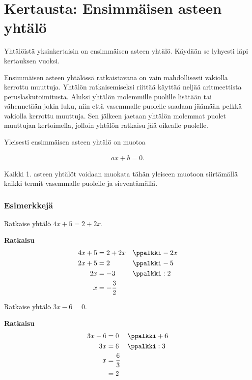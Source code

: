 \section{Kertausta: Ensimmäisen asteen yhtälö}

Yhtälöistä yksinkertaisin on ensimmäisen asteen yhtälö. Käydään se lyhyesti
läpi kertauksen vuoksi.

Ensimmäisen asteen yhtälössä ratkaistavana on vain mahdollisesti vakiolla
kerrottu muuttuja. Yhtälön ratkaisemiseksi riittää käyttää neljää
aritmeettista peruslaskutoimitusta. Aluksi yhtälön molemmille puolille 
lisätään tai vähennetään jokin luku, niin että 
vasemmalle puolelle saadaan jäämään pelkkä vakiolla kerrottu muuttuja.
Sen jälkeen jaetaan yhtälön molemmat puolet muuttujan kertoimella, jolloin
yhtälön ratkaisu jää oikealle puolelle.


Yleisesti ensimmäisen asteen yhtälö on muotoa

\begin{align*}
    ax + b = 0.
\end{align*}

Kaikki 1. asteen yhtälöt voidaan muokata tähän yleiseen
muotoon siirtämällä kaikki termit vasemmalle puolelle ja
sieventämällä.


\subsubsection*{Esimerkkejä}

\begin{esimerkki}
Ratkaise yhtälö $4x + 5 = 2 + 2x$.

\textbf{Ratkaisu}
\begin{align*}
    4x + 5 &= 2 + 2x && \ppalkki -2x \\
    2x + 5 &= 2      && \ppalkki -5 \\
        2x &= -3     && \ppalkki :2 \\
         x &= -\frac{3}{2}
 \end{align*}
\end{esimerkki}

\begin{esimerkki}
Ratkaise yhtälö $3x - 6 = 0$.

\textbf{Ratkaisu}
  \begin{align*}
    3x - 6 &= 0 && \ppalkki +6 \\
        3x &= 6 && \ppalkki :3 \\
         x &= \frac{6}{3} \\
           &= 2
  \end{align*}
\end{esimerkki}

